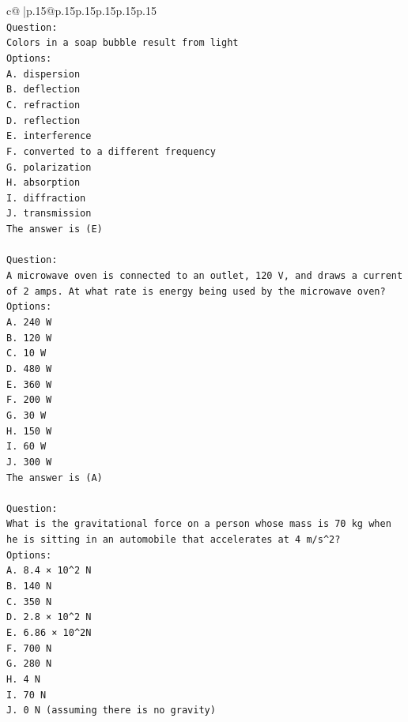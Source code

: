\documentclass{article}
\begin{document}
{\begin{supertabular}{c@{$\;$}|p{.15\linewidth}@{}p{.15\linewidth}p{.15\linewidth}p{.15\linewidth}p{.15\linewidth}p{.15\linewidth}}
{{{\\ 
\texttt{Question:} \\
\texttt{Colors in a soap bubble result from light} \\
\texttt{Options:} \\
\texttt{A. dispersion} \\
\texttt{B. deflection} \\
\texttt{C. refraction} \\
\texttt{D. reflection} \\
\texttt{E. interference} \\
\texttt{F. converted to a different frequency} \\
\texttt{G. polarization} \\
\texttt{H. absorption} \\
\texttt{I. diffraction} \\
\texttt{J. transmission} \\
\texttt{The answer is (E)} \\
\\ 
\texttt{Question:} \\
\texttt{A microwave oven is connected to an outlet, 120 V, and draws a current of 2 amps. At what rate is energy being used by the microwave oven?} \\
\texttt{Options:} \\
\texttt{A. 240 W} \\
\texttt{B. 120 W} \\
\texttt{C. 10 W} \\
\texttt{D. 480 W} \\
\texttt{E. 360 W} \\
\texttt{F. 200 W} \\
\texttt{G. 30 W} \\
\texttt{H. 150 W} \\
\texttt{I. 60 W} \\
\texttt{J. 300 W} \\
\texttt{The answer is (A)} \\
\\ 
\texttt{Question:} \\
\texttt{What is the gravitational force on a person whose mass is 70 kg when he is sitting in an automobile that accelerates at 4 m/s\^{}2?} \\
\texttt{Options:} \\
\texttt{A. 8.4 × 10\^{}2 N} \\
\texttt{B. 140 N} \\
\texttt{C. 350 N} \\
\texttt{D. 2.8 × 10\^{}2 N} \\
\texttt{E. 6.86 × 10\^{}2N} \\
\texttt{F. 700 N} \\
\texttt{G. 280 N} \\
\texttt{H. 4 N} \\
\texttt{I. 70 N} \\
\texttt{J. 0 N (assuming there is no gravity)} \\
            }
        }
    }
     \\ \\


\end{supertabular}}
\end{document}
